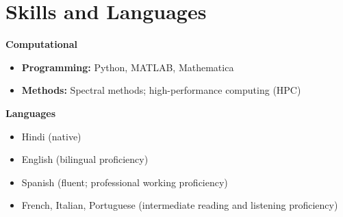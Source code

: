 \documentclass[letterpaper,10pt]{article} %
\begin{document}
\section{\color{headcol}Skills and Languages}
\vspace{5pt}
\textbf{\color{subhead}Computational}
\begin{itemize}[leftmargin=1.2em, itemsep=3pt, topsep=2pt, parsep=0pt, partopsep=0pt]
    \item \textbf{Programming:} Python, MATLAB, Mathematica
    \item \textbf{Methods:} Spectral methods; high-performance computing (HPC)
\end{itemize}

\vspace{4pt}
\textbf{\color{subhead}Languages}
\begin{itemize}[leftmargin=1.2em, itemsep=3pt, topsep=2pt, parsep=0pt, partopsep=0pt]
    \item Hindi (native)
    \item English (bilingual proficiency)
    \item Spanish (fluent; professional working proficiency)
    \item French, Italian, Portuguese (intermediate reading and listening proficiency)
\end{itemize}


% 
\end{document}
